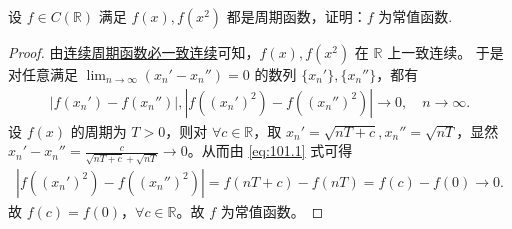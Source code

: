 \documentclass[../../main.tex]{subfiles}%
\begin{document}
\begin{example}
设 \(f \in C(\mathbb{R})\) 满足 \(f(x), f(x^2)\) 都是周期函数，证明：\(f\) 为常值函数. 
\end{example}
\begin{proof}
由\hyperref[proposition:连续周期函数必一致连续]{连续周期函数必一致连续}可知，\(f(x),f(x^2)\) 在 \(\mathbb{R}\) 上一致连续。
于是对任意满足 \(\lim_{n \to \infty} (x_n' - x_n'') = 0\) 的数列 \(\{x_n'\}, \{x_n''\}\)，都有
\begin{align}
|f(x_n') - f(x_n'')|, |f((x_n')^2) - f((x_n'')^2)| \to 0, \quad n \to \infty. \label{eq:101.1}
\end{align}
设 \(f(x)\) 的周期为 \(T > 0\)，则对 \(\forall c \in \mathbb{R}\)，取 \(x_n' = \sqrt{nT + c}, x_n'' = \sqrt{nT}\)，显然 \(x_n' - x_n'' = \frac{c}{\sqrt{nT + c} + \sqrt{nT}} \to 0\)。从而由 \eqref{eq:101.1} 式可得
\begin{align*}
|f((x_n')^2) - f((x_n'')^2)| = f(nT + c) - f(nT) = f(c) - f(0) \to 0.
\end{align*}
故 \(f(c) = f(0)\)，\(\forall c \in \mathbb{R}\)。故 \(f\) 为常值函数。
\end{proof}
\end{document}
